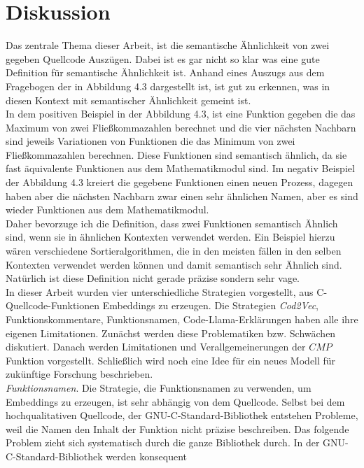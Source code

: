 \documentclass[12pt,letterpaper,ngerman]{article}
\begin{document}
\section{Diskussion}
Das zentrale Thema dieser Arbeit, ist die semantische Ähnlichkeit
von zwei gegeben Quellcode Auszügen. Dabei ist es gar nicht so klar 
was eine gute Definition für semantische Ähnlichkeit ist.
Anhand eines Auszugs aus dem Fragebogen der in Abbildung 4.3 
dargestellt ist, ist gut zu erkennen,
was in diesen Kontext mit semantischer Ähnlichkeit gemeint ist.\\
In dem positiven Beispiel in der Abbildung 4.3, ist eine Funktion
gegeben die das Maximum von zwei Fließkommazahlen berechnet und die
vier
nächsten Nachbarn sind jeweils Variationen von Funktionen die das
Minimum von zwei Fließkommazahlen berechnen. Diese Funktionen sind
semantisch ähnlich, da sie fast äquivalente Funktionen aus dem
Mathematikmodul sind. Im negativ Beispiel der Abbildung 4.3 kreiert
die gegebene Funktionen einen neuen Prozess, dagegen haben aber die 
nächsten Nachbarn zwar einen sehr ähnlichen Namen, aber es sind 
wieder Funktionen aus dem Mathematikmodul.\\
Daher bevorzuge ich die Definition, dass zwei Funktionen semantisch
Ähnlich sind, wenn sie in ähnlichen Kontexten verwendet werden. 
Ein Beispiel hierzu wären verschiedene Sortieralgorithmen, die in 
den meisten fällen in den selben Kontexten verwendet werden können 
und damit semantisch sehr Ähnlich sind. Natürlich ist diese 
Definition nicht gerade präzise sondern sehr vage.\\
In dieser Arbeit wurden vier unterschiedliche Strategien
vorgestellt, aus C-Quellcode-Funktionen Embeddings zu erzeugen.
Die Strategien \textit{Cod2Vec}, Funktionskommentare, 
Funktionsnamen, Code-Llama-Erklärungen haben alle ihre 
eigenen Limitationen. Zunächst werden diese Problematiken
bzw. Schwächen diskutiert. Danach werden Limitationen 
und Verallgemeinerungen der $CMP$ Funktion vorgestellt.
Schließlich wird noch eine Idee für ein neues Modell 
für zukünftige Forschung beschrieben.
\pagebreak\\
\textit{Funktionsnamen}. Die Strategie, die Funktionsnamen zu 
verwenden, um Embeddings zu erzeugen, ist sehr abhängig von 
dem Quellcode. Selbst bei dem hochqualitativen Quellcode, 
der GNU-C-Standard-Bibliothek entstehen Probleme, weil die 
Namen den Inhalt der Funktion nicht präzise beschreiben.
Das folgende Problem zieht sich systematisch durch die 
ganze Bibliothek durch. In der GNU-C-Standard-Bibliothek
werden konsequent 
\end{document}
